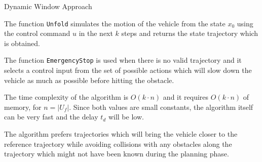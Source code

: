 \begin{algorithm}
	\SetAlgoLined
	\DontPrintSemicolon
	
	
	
	
	\BlankLine
	
		
	\caption{Dynamic Window Approach}
	\label{alg:dwa}
\end{algorithm}

The function \texttt{Unfold} simulates the motion of the vehicle from the state $x_0$ using the control command $u$ in the next $k$ steps and returns the state trajectory which is obtained.

The function \texttt{EmergencyStop} is used when there is no valid trajectory and it selects a control input from the set of possible actions which will slow down the vehicle as much as possible before hitting the obstacle.

The time complexity of the algorithm is $O(k\cdot n)$ and it requires $O(k\cdot n)$ of memory, for $n=|U_f|$. Since both values are small constants, the algorithm itself can be very fast and the delay $t_d$ will be low.

The algorithm prefers trajectories which will bring the vehicle closer to the reference trajectory while avoiding collisions with any obstacles along the trajectory which might not have been known during the planning phase.

